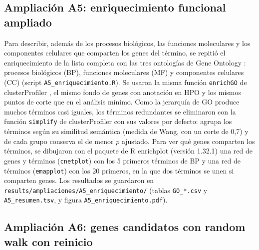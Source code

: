 \subsection{Ampliación A5: enriquecimiento funcional ampliado}

Para describir, además de los procesos biológicos, las funciones moleculares y los componentes celulares que comparten los genes del término, se repitió el enriquecimiento de la lista completa con las tres ontologías de Gene Ontology \cite{Ashburner2000}: procesos biológicos (BP), funciones moleculares (MF) y componentes celulares (CC) (script \texttt{A5\_enriquecimiento.R}). Se usaron la misma función \texttt{enrichGO} de clusterProfiler \cite{Wu2021}, el mismo fondo de genes con anotación en HPO y los mismos puntos de corte que en el análisis mínimo. Como la jerarquía de GO produce muchos términos casi iguales, los términos redundantes se eliminaron con la función \texttt{simplify} de clusterProfiler con sus valores por defecto: agrupa los términos según su similitud semántica (medida de Wang, con un corte de 0,7) y de cada grupo conserva el de menor $p$ ajustado. Para ver qué genes comparten los términos, se dibujaron con el paquete de R enrichplot (versión 1.32.1) una red de genes y términos (\texttt{cnetplot}) con los 5 primeros términos de BP y una red de términos (\texttt{emapplot}) con los 20 primeros, en la que dos términos se unen si comparten genes. Los resultados se guardaron en \texttt{results/ampliaciones/A5\_enriquecimiento/} (tablas \texttt{GO\_*.csv} y \texttt{A5\_resumen.tsv}, y figura \texttt{A5\_enriquecimiento.pdf}).

\subsection{Ampliación A6: genes candidatos con random walk con reinicio}

